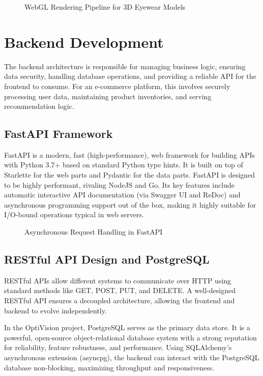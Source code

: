 \begin{figure}[H]
    \centering
    \vspace{8cm}
    \caption{WebGL Rendering Pipeline for 3D Eyewear Models}
    \label{fig:webgl_pipeline}
\end{figure}

\section{Backend Development}
\label{sec:back_backend}

The backend architecture is responsible for managing business logic, ensuring data security, handling database operations, and providing a reliable API for the frontend to consume. For an e-commerce platform, this involves securely processing user data, maintaining product inventories, and serving recommendation logic.

\subsection{FastAPI Framework}
FastAPI is a modern, fast (high-performance), web framework for building APIs with Python 3.7+ based on standard Python type hints. It is built on top of Starlette for the web parts and Pydantic for the data parts. FastAPI is designed to be highly performant, rivaling NodeJS and Go. Its key features include automatic interactive API documentation (via Swagger UI and ReDoc) and asynchronous programming support out of the box, making it highly suitable for I/O-bound operations typical in web servers.

\begin{figure}[H]
    \centering
    \vspace{8cm}
    \caption{Asynchronous Request Handling in FastAPI}
    \label{fig:fastapi_async}
\end{figure}

\subsection{RESTful API Design and PostgreSQL}
RESTful APIs allow different systems to communicate over HTTP using standard methods like GET, POST, PUT, and DELETE. A well-designed RESTful API ensures a decoupled architecture, allowing the frontend and backend to evolve independently.

In the OptiVision project, PostgreSQL serves as the primary data store. It is a powerful, open-source object-relational database system with a strong reputation for reliability, feature robustness, and performance. Using SQLAlchemy's asynchronous extension (asyncpg), the backend can interact with the PostgreSQL database non-blocking, maximizing throughput and responsiveness.

